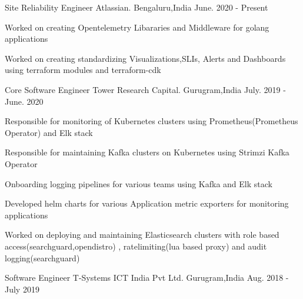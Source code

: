

\begin{cventries}

    \cventry
    {Site Reliability Engineer} %
    {Atlassian.} %
    {Bengaluru,India} %
    {June. 2020 - Present} %
    {
      \begin{cvitems} %
               \item { Worked on creating Opentelemetry Libararies and Middleware for golang applications }
               \item { Worked on creating standardizing Visualizations,SLIs, Alerts and Dashboards using terraform modules and terraform-cdk} 		
	  \end{cvitems}
    }
    \cventry
    {Core Software Engineer} %
    {Tower Research Capital.} %
    {Gurugram,India} %
    {July. 2019 - June. 2020} %
    {
      \begin{cvitems} %
	    \item { Responsible for monitoring of  Kubernetes clusters using Prometheus(Prometheus Operator) and Elk stack }
               \item { Responsible for maintaining  Kafka clusters on Kubernetes using  Strimzi Kafka Operator }
               \item { Onboarding logging pipelines for various teams using Kafka and Elk stack }
               \item { Developed helm charts for various Application metric exporters for monitoring applications  }
               \item { Worked on deploying and maintaining Elasticsearch clusters with role based access(searchguard,opendistro) , ratelimiting(lua based proxy) and audit logging(searchguard)} 		
	  \end{cvitems}
    }
    \cventry
    {Software Engineer} %
    {T-Systems ICT India Pvt Ltd.} %
    {Gurugram,India} %
    {Aug. 2018 - July 2019} %

\end{cventries}

